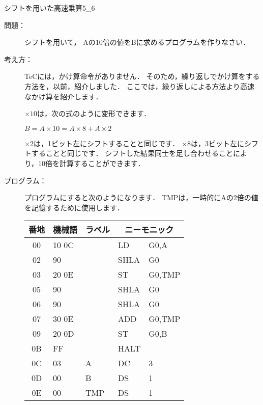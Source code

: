 \newpage
\begin{reidai}{シフトを用いた高速乗算}{5_6}
\begin{description}
\item[問題：] シフトを用いて，
Aの10倍の値をBに求めるプログラムを作りなさい．

\item[考え方：]
TeCには，かけ算命令がありません．
そのため，繰り返しでかけ算をする方法を，以前，紹介しました．
ここでは，繰り返しによる方法より高速なかけ算を紹介します．

$\times 10$は，次の式のように変形できます．

\begin{center}
$B = A \times 10 = A \times 8 + A \times 2$
\end{center}

$\times 2$は，1ビット左にシフトすることと同じです．
$\times 8$は，3ビット左にシフトすることと同じです．
シフトした結果同士を足し合わせることにより，10倍を計算することができます．

\item[プログラム：]
プログラムにすると次のようになります．
TMPは，一時的にAの2倍の値を記憶するために使用します．

{\tt\small\begin{center}
\begin{tabular}{|c|l|l|l l|} \hline
番地 & 機械語 & ラベル & \multicolumn{2}{|c|}{ニーモニック} \\
\hline
00 & 10 0C &     & LD   & G0,A   \\
02 & 90    &     & SHLA & G0     \\
03 & 20 0E &     & ST   & G0,TMP \\
05 & 90    &     & SHLA & G0     \\
06 & 90    &     & SHLA & G0     \\
07 & 30 0E &     & ADD  & G0,TMP \\
09 & 20 0D &     & ST   & G0,B   \\
0B & FF    &     & HALT &        \\
0C & 03    & A   & DC   & 3      \\
0D & 00    & B   & DS   & 1      \\
0E & 00    & TMP & DS   & 1      \\
\hline
\end{tabular}
\end{center}}

\end{description}
\end{reidai}

